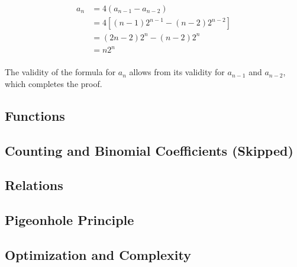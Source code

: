 \documentclass[../src/handouts/main.tex]{subfiles}
\begin{document}
$$
  \begin{aligned}
    a_n & = 4 (a_{n - 1} - a_{n - 2})                             \\
        & = 4 \left[ (n - 1) 2^{n - 1} - (n - 2) 2^{n -2} \right] \\
        & = (2 n - 2) 2^n - (n - 2) 2^n                           \\
        & = n 2^n                                                 \\
  \end{aligned}
$$

The validity of the formula for $a_n$ allows from its validity for $a_{n -1}$ and $a_{n - 2}$, which completes the proof.

\subsection{Functions}

\subsection{Counting and Binomial Coefficients (Skipped)}

\subsection{Relations}

\subsection{Pigeonhole Principle}

\subsection{Optimization and Complexity}
\end{document}
